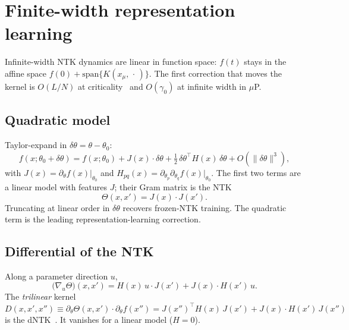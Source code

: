 \section{Finite-width representation learning}
\label{sec:dntk}

Infinite-width NTK dynamics are linear in function space: $f(t)$ stays in the affine space $f(0)+\mathrm{span}\{K(x_\mu,\,\cdot\,)\}$. The first correction that moves the kernel is $O(L/N)$ at criticality~\cite{roberts2022pdlt} and $O(\gamma_0)$ at infinite width in $\mu$P.

\subsection{Quadratic model}

Taylor-expand in $\delta\theta=\theta-\theta_0$:
\begin{equation}
  f(x;\theta_0+\delta\theta)
  =f(x;\theta_0)
  +J(x)\cdot\delta\theta
  +\tfrac12\,\delta\theta^\top H(x)\,\delta\theta
  +O(\|\delta\theta\|^3),
  \label{eq:taylor}
\end{equation}
with $J(x)=\partial_\theta f(x)|_{\theta_0}$ and $H_{pq}(x)=\partial_{\theta_p}\partial_{\theta_q}f(x)|_{\theta_0}$. The first two terms are a linear model with features $J$; their Gram matrix is the NTK
\begin{equation}
  \Theta(x,x')=J(x)\cdot J(x').
  \label{eq:ntk-again}
\end{equation}
Truncating at linear order in $\delta\theta$ recovers frozen-NTK training. The quadratic term is the leading representation-learning correction.

\subsection{Differential of the NTK}

Along a parameter direction $u$,
\begin{equation}
  \bigl(\nabla_u\Theta\bigr)(x,x')
  =H(x)\,u\cdot J(x')
  +J(x)\cdot H(x')\,u.
  \label{eq:dntk}
\end{equation}
The \emph{trilinear} kernel
\begin{equation}
  D(x,x',x'')
  \equiv
  \partial_\theta\Theta(x,x')\cdot\partial_\theta f(x'')
  =J(x'')^\top H(x)\,J(x')
  +J(x)\cdot H(x')\,J(x'')
  \label{eq:dntk-def}
\end{equation}
is the dNTK~\cite{roberts2022pdlt}. It vanishes for a linear model ($H=0$).


